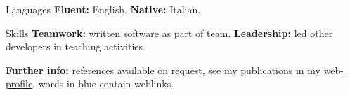 
\begin{cvskills}

\cvskill
{Languages}
{\textbf{Fluent:} English. \textbf{Native:} Italian.}

\cvskill
{Skills}
{\textbf{Teamwork:} written software as part of team. \textbf{Leadership:} led 
other developers in teaching activities.}

\end{cvskills}

\vspace{-1mm}
\flushleft
\footnotesize
\item {\color{awesome-red}\textbf{Fur}}{\color{awesome-darknight}\textbf{ther 
info:}} references available on request, see my publications in my 
{\color{myblue}\href{https://www.ncl.ac.uk/engineering/staff/profile/alessandrode-gennaro.html}{web-profile}},
words in {\color{myblue}blue} contain weblinks.